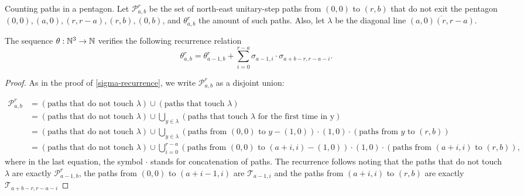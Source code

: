 \begin{subsubsection}{Counting paths in a pentagon.} Let $\mathcal{P}_{a,b}^r$ be the set of north-east unitary-step paths from $(0,0)$ to $(r,b)$ that do not exit the pentagon $(0,0),(a,0),(r,r-a),(r,b),(0,b)$, and $\theta_{a,b}^r$ the amount of such paths. Also, let $\lambda$ be the diagonal line $\overline{(a,0)(r,r-a)}$. 
\begin{myprop}
    The sequence $\theta:\mathbb{N}^3\to \mathbb{N}$ verifies the following recurrence relation
    $$
    \displaystyle \theta_{a,b}^r = \theta_{a-1,b}^r + \sum_{i=0}^{r-a}\sigma_{a-1,i}\cdot \sigma_{a+b-r,r-a-i}.
    $$
 \end{myprop}
 \begin{proof}
 As in the proof of \ref{sigma-recurrence}, we write $\mathcal{P}_{a,b}^r$ as a disjoint union:

 \begin{align*}
 \mathcal{P}_{a,b}^r &= (\mbox{paths that do not touch }\lambda)\cup (\mbox{paths that touch }\lambda)\\
                     &= (\mbox{paths that do not touch }\lambda)\cup \bigcup_{y\in \lambda} (\mbox{paths that touch }\lambda\mbox{ for the first time in y})\\
                     &= (\mbox{paths that do not touch }\lambda)\cup \bigcup_{y\in \lambda} (\mbox{paths from }(0,0)\mbox{ to }y-(1,0))\cdot (1,0)\cdot (\mbox{paths from }y\mbox{ to }(r,b))\\
                     &= (\mbox{paths that do not touch }\lambda)\cup \bigcup_{i = 0}^{r-a} (\mbox{paths from }(0,0)\mbox{ to }(a+i,i)-(1,0))\cdot (1,0)\cdot (\mbox{paths from }(a+i,i)\mbox{ to }(r,b)),
 \end{align*}
 where in the last equation, the symbol $\cdot$ stands for concatenation of paths. The recurrence follows noting that the paths that do not touch $\lambda$ are exactly $\mathcal{P}_{a-1,b}^r$, the paths from $(0,0)$ to $(a+i-1,i)$ are $\mathcal{T}_{a-1,i}$ and the paths from $(a+i,i)$ to $(r,b)$ are exactly $\mathcal{T}_{a+b-r,r-a-i}$ \end{proof}



\end{subsubsection}
